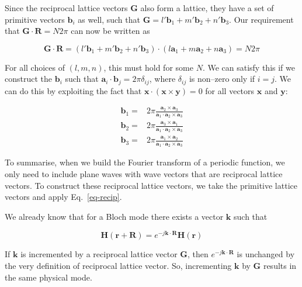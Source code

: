Since the reciprocal lattice vectors ${\mathbf G}$ also form a lattice, they have a set of primitive vectors ${\mathbf b}_i$ as well, such that ${\mathbf G} = l' {\mathbf b}_1 + m' {\mathbf b}_2 + n' {\mathbf b}_3$. Our requirement that ${\mathbf G} \cdot {\mathbf R} = N 2 \pi$ can now be written as

\begin{equation}
{\mathbf G} \cdot {\mathbf R} = ( l' {\mathbf b}_1 + m' {\mathbf b}_2 + n' {\mathbf b}_3) \cdot (l {\mathbf a}_1 + m {\mathbf a}_2 + n {\mathbf a}_3)  = N 2 \pi 
\end{equation} 

For all choices of $(l,m,n)$, this must hold for some $N$. We can satisfy this if we construct the ${\mathbf b}_i$ such that ${\mathbf a}_i \cdot {\mathbf b}_j = 2 \pi \delta_{ij}$, where $\delta_{ij}$ is non--zero only if $i=j$. We can do this by exploiting the fact that $ {\mathbf x} \cdot ({\mathbf x} \times {\mathbf y}) = 0$ for all vectors ${\mathbf x}$ and ${\mathbf y}$:

\begin{align}
{\mathbf b}_1 =& 2 \pi \frac{{\mathbf a}_2 \times {\mathbf a}_3}{{\mathbf a}_1 \cdot {\mathbf a}_2 \times {\mathbf a}_3} \nonumber \\
{\mathbf b}_2 =& 2 \pi \frac{{\mathbf a}_3 \times {\mathbf a}_1}{{\mathbf a}_1 \cdot {\mathbf a}_2 \times {\mathbf a}_3} \nonumber \\
{\mathbf b}_3 =& 2 \pi \frac{{\mathbf a}_1 \times {\mathbf a}_2}{{\mathbf a}_1 \cdot {\mathbf a}_2 \times {\mathbf a}_3}
\label{eq-recip}
\end{align} 

To summarise, when we build the Fourier transform of a periodic function, we only need to include plane waves with wave vectors that are reciprocal lattice vectors. To construct these reciprocal lattice vectors, we take the primitive lattice vectors and apply Eq.~\ref{eq-recip}.

\pagebreak


We already know that for a Bloch mode there exists a vector ${\mathbf k}$ such that

\begin{equation}
{\mathbf H} ({\mathbf r}+ {\mathbf R}) = e^{-j {\mathbf k} \cdot {\mathbf R}} {\mathbf H} ({\mathbf r})
\end{equation} 

If ${\mathbf k}$ is incremented by a reciprocal lattice vector ${\mathbf G}$, then $e^{-j {\mathbf k} \cdot {\mathbf R}}$ is unchanged by the very definition of reciprocal lattice vector. So, incrementing ${\mathbf k}$ by ${\mathbf G}$ results in the same physical mode.

